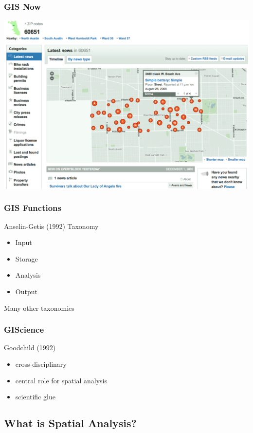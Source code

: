 \documentclass[nototal]{beamer}
\begin{document}
\begin{frame}
	\frametitle{GIS Now}
 \begin{center}
 \includegraphics[width=.85\linewidth]{crimemap.png}
  \end{center}
 \end{frame} 

\begin{frame}
	\frametitle{GIS Functions}
 
\begin{block}{Anselin-Getis (1992) Taxonomy}
 \begin{itemize}
 \item  Input
 \item  Storage
 \item  \alert{Analysis}
 \item  Output
 \end{itemize}
  Many other taxonomies
 \end{block} \end{frame} 

\begin{frame}
	\frametitle{GIScience}
 
\begin{block}{Goodchild (1992)}
 \begin{itemize}
 \item  cross-disciplinary
 \item  \alert{central} role for spatial analysis
 \item  scientific \alert{glue}
 \end{itemize}
 \end{block} \end{frame} 

\subsection{What is Spatial Analysis?} 
\end{document}
